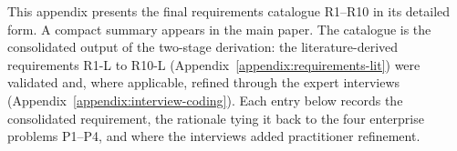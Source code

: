 This appendix presents the final requirements catalogue R1--R10 in its detailed form. A compact summary appears in the main paper. The catalogue is the consolidated output of the two-stage derivation: the literature-derived requirements R1-L to R10-L (Appendix~\ref{appendix:requirements-lit}) were validated and, where applicable, refined through the expert interviews (Appendix~\ref{appendix:interview-coding}). Each entry below records the consolidated requirement, the rationale tying it back to the four enterprise problems P1--P4, and where the interviews added practitioner refinement.

\begin{table}[!t]
\renewcommand{\arraystretch}{1.4}
\caption{Final requirements catalogue R1--R10 with rationale and interview-derived refinement notes.}
\label{tab:requirements-final}
\centering\footnotesize


\end{table}

